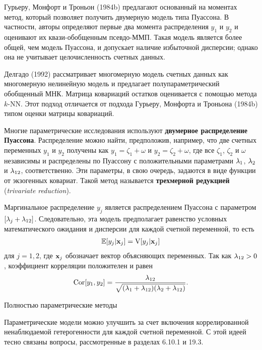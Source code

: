Гурьеру, Монфорт и Троньон (1984b) предлагают основанный на моментах метод, который позволяет получить двумерную модель типа Пуассона. В частности, авторы определяют первые два момента распределения $y_1$ и $y_2$ и оценивают их квази-обобщенным псевдо-ММП. Такая модель является более общей, чем модель Пуассона, и допускает наличие избыточной дисперсии; однако она не учитывает целочисленность счетных данных.

Делгадо (1992) рассматривает многомерную модель счетных данных как многомерную нелинейную модель и предлагает полупараметрический обобщенный МНК. Матрица ковариаций остатков оценивается с помощью метода $k$-NN. Этот подход отличается от подхода Гурьеру, Монфорта и Троньона (1984b) типом оценки матрицы ковариаций.

Многие параметрические исследования используют \textbf{двумерное распределение Пуассона}. Распределение можно найти, предположив, например, что две счетных переменных $y_1$ и $y_2$ получены как $y_1 = \zeta_1 + \omega$ и $y_2 = \zeta_2 + \omega$, где все $\zeta_1$, $\zeta_2$ и $\omega$ независимы и распределены по Пуассону с положительными параметрами $\lambda_1$, $\lambda_2$ и $\lambda_{12}$, соответственно. Эти параметры, в свою очередь, задаются в виде функции от экзогенных ковариат. Такой метод называется \textbf{трехмерной редукцией} (\textit{trivariate reduction}).

Маргинальное распределение $y_j$ является распределением Пуассона с параметром $[\lambda_j + \lambda_{12}]$.
Следовательно, эта модель предполагает равенство условных математического ожидания и дисперсии для каждой счетной переменной, то есть
    \begin{align}\label{eq:20.21}
    \mathbb{E}[y_j|\mathbf{x}_j] = \mathrm{V}[y_j|\mathbf{x}_j]
    \end{align}
для $j = 1, 2$, где $\mathbf{x}_j$ обозначает вектор объясняющих переменных. Так как $\lambda_{12} > 0$, коэффициент корреляции положителен и равен
    \begin{align}\label{eq:20.22}
    \mathrm{Cor}[y_1, y_2] = \frac{\lambda_{12}}{\sqrt{(\lambda_1 + \lambda_{12})(\lambda_2 + \lambda_{12})}}.
    \end{align}


        \begin{center}{Полностью параметрические методы}\end{center}
        \noindent
Параметрические модели можно улучшить за счет включения коррелированной ненаблюдаемой гетерогенности для каждой счетной переменной. С этой идеей тесно связаны вопросы, рассмотренные в разделах 6.10.1 и 19.3.


